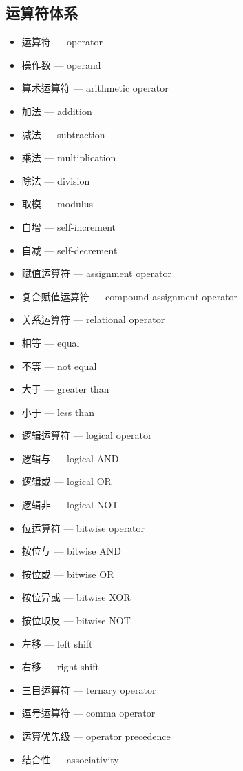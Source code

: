\subsection{运算符体系}
\begin{itemize}
\item 运算符 — operator
\item 操作数 — operand
\item 算术运算符 — arithmetic operator
\item 加法 — addition
\item 减法 — subtraction
\item 乘法 — multiplication
\item 除法 — division
\item 取模 — modulus
\item 自增 — self-increment
\item 自减 — self-decrement
\item 赋值运算符 — assignment operator
\item 复合赋值运算符 — compound assignment operator
\item 关系运算符 — relational operator
\item 相等 — equal
\item 不等 — not equal
\item 大于 — greater than
\item 小于 — less than
\item 逻辑运算符 — logical operator
\item 逻辑与 — logical AND
\item 逻辑或 — logical OR
\item 逻辑非 — logical NOT
\item 位运算符 — bitwise operator
\item 按位与 — bitwise AND
\item 按位或 — bitwise OR
\item 按位异或 — bitwise XOR
\item 按位取反 — bitwise NOT
\item 左移 — left shift
\item 右移 — right shift
\item 三目运算符 — ternary operator
\item 逗号运算符 — comma operator
\item 运算优先级 — operator precedence
\item 结合性 — associativity
\end{itemize}

